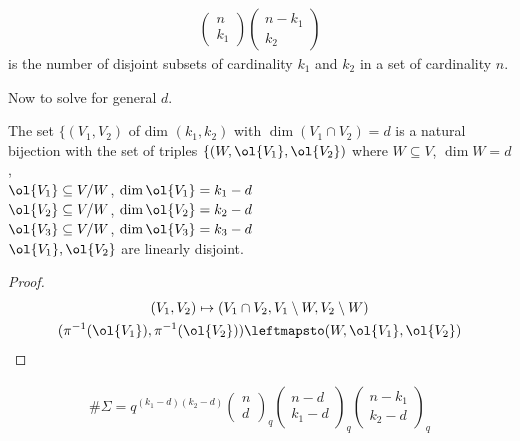 \documentclass[class=scrartcl, crop=false]{standalone}
\begin{document}
\begin{remark}
  \begin{gather*}
    \begin{pmatrix}
      n \\ k_1
    \end{pmatrix} 
    \begin{pmatrix}
      n - k_1 \\ k_2
    \end{pmatrix} 
  \end{gather*} is the number of disjoint subsets of cardinality $k_1$ and $k_2$ in a set of cardinality $n$.
\end{remark} 

Now to solve for general $d$.
\begin{lemma}
  The set $\{(V_1, V_2)$ of dim $(k_1, k_2)$ with $\dim(V_1 \cap V_2) = d$ is a natural bijection with the set of triples $\{(W, \ol{V_1}, \ol{V_2})$ where $W \subseteq V$, $\dim W = d$, 
      \\
      $\ol{V_1} \subseteq V / W$, $\dim \ol{V_1} = k_1 - d$ 
      \\
      $\ol{V_2} \subseteq V / W$, $\dim \ol{V_2} = k_2 - d$ 
      \\
      $\ol{V_3} \subseteq V / W$, $\dim \ol{V_3} = k_3 - d$ 
      \\
      $\ol{V_1}, \ol{V_2}$ are linearly disjoint.
      \begin{proof}
        \begin{gather*}
          (V_1, V_2) \mapsto (V_1 \cap V_2, V_1 \setminus W, V_2 \setminus W) \\
          (\pi^{-1}(\ol{V_1}), \pi^{-1}(\ol{V_2})) \leftmapsto (W, \ol{V_1}, \ol{V_2})
        \end{gather*} 
      \end{proof} 
\end{lemma} 

\begin{gather*}
  \#\Sigma = q^{(k_1 - d)(k_2 - d)}
  \begin{pmatrix}
    n \\ d
  \end{pmatrix}_q
  \begin{pmatrix}
    n - d \\ k_1 - d
  \end{pmatrix}_q
  \begin{pmatrix}
    n - k_1 \\ k_2 - d
  \end{pmatrix}_q
\end{gather*} 
\end{document}
